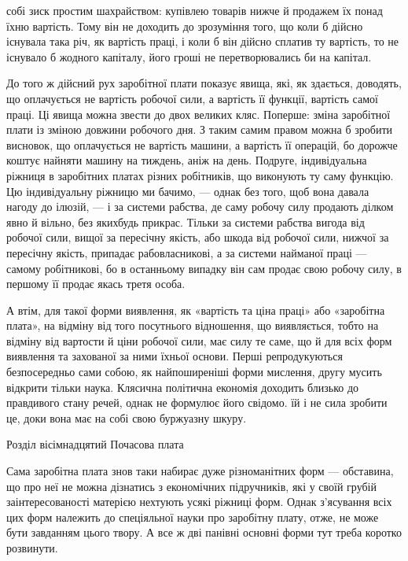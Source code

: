 \parcont{}  %
собі зиск простим шахрайством: купівлею товарів нижче й продажем
їх понад їхню вартість. Тому він не доходить до зрозуміння
того, що коли б дійсно існувала така річ, як вартість праці, і
коли б він дійсно сплатив ту вартість, то не існувало б жодного
капіталу, його гроші не перетворювались би на капітал.

До того ж дійсний рух заробітної плати показує явища, які,
як здається, доводять, що оплачується не вартість робочої
сили, а вартість її функції, вартість самої праці. Ці явища можна
звести до двох великих кляс. Поперше: зміна заробітної плати
із зміною довжини робочого дня. З таким самим правом можна б
зробити висновок, що оплачується не вартість машини, а вартість
її операцій, бо дорожче коштує найняти машину на тиждень,
аніж на день. Подруге, індивідуальна ріжниця в заробітних
платах різних робітників, що виконують ту саму функцію. Цю індивідуальну
ріжницю ми бачимо, — однак без того, щоб вона давала
нагоду до ілюзій, — і за системи рабства, де саму робочу силу
продають ділком явно й вільно, без якихбудь прикрас. Тільки за
системи рабства вигода від робочої сили, вищої за пересічну якість,
або шкода від робочої сили, нижчої за пересічну якість, припадає
рабовласникові, а за системи найманої праці — самому
робітникові, бо в останньому випадку він сам продає свою робочу
силу, в першому її продає якась третя особа.

А втім, для такої форми виявлення, як «вартість та ціна праці»
або «заробітна плата», на відміну від того посутнього відношення,
що виявляється, тобто на відміну від вартости й ціни робочої
сили, має силу те саме, що й для всіх форм виявлення та захованої
за ними їхньої основи. Перші репродукуються безпосередньо
сами собою, як найпоширеніші форми мислення, другу мусить
відкрити тільки наука. Клясична політична економія доходить
близько до правдивого стану речей, однак не формулює його
свідомо. їй і не сила зробити це, доки вона має на собі свою буржуазну
шкуру.

Розділ вісімнадцятий
Почасова плата

Сама заробітна плата знов таки набирає дуже різноманітних
форм — обставина, що про неї не можна дізнатись з економічних
підручників, які у своїй грубій заінтересованості матерією нехтують
усякі ріжниці форм. Однак з’ясування всіх цих форм
належить до спеціяльної науки про заробітну плату, отже, не
може бути завданням цього твору. А все ж дві панівні основні
форми тут треба коротко розвинути.

